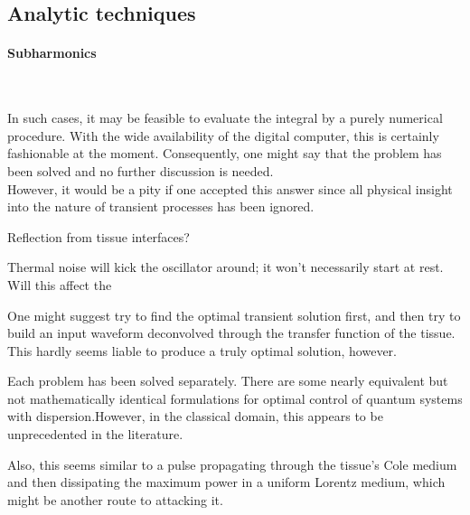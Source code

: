 \documentclass[paper.tex]{subfiles}
\begin{document}
\subsection{Analytic techniques}


\paragraph{\textbf{Subharmonics}}\


\begin{fquote}
	In such cases, it may be feasible to evaluate the integral by a purely numerical procedure. With the wide availability of the digital computer, this is certainly fashionable at the moment. Consequently, one might say that the problem has been solved and no further discussion is needed. \\
	
	However, it would be a pity if one accepted this answer since all physical insight into the nature of transient processes has been ignored. 
\end{fquote}





\begin{autem}
Reflection from tissue interfaces?

Thermal noise will kick the oscillator around; it won't necessarily start at rest. Will this affect the 
\end{autem}

One might suggest try to find the optimal transient solution first, and then try to build an input waveform deconvolved through the  transfer function of the tissue. This hardly seems liable to produce a truly optimal solution, however.

Each problem has been solved separately. There are some nearly equivalent but not mathematically identical formulations for optimal control of quantum systems with dispersion.\footnotemark However, in the classical domain, this appears to be unprecedented in the literature.


Also, this seems similar to a pulse propagating through the tissue's Cole medium and then dissipating the maximum power in a uniform Lorentz medium, which might be another route to attacking it.
\end{document}
